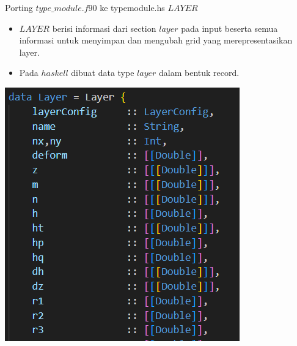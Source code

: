\documentclass{beamer}
\begin{document}
\begin{frame}{Porting $type\_module.f90$ ke typemodule.hs}
    $LAYER$
    \begin{itemize}
        \item $LAYER$ berisi informasi dari section $layer$ pada input beserta 
        semua informasi untuk menyimpan dan mengubah grid yang merepresentasikan layer.
        \item Pada $haskell$ dibuat data type $layer$ dalam bentuk record. 
    \end{itemize}
    \begin{center}
        \includegraphics[scale=0.5]{figure/tmodule1.png}
    \end{center}
   
\end{frame}
\end{document}
